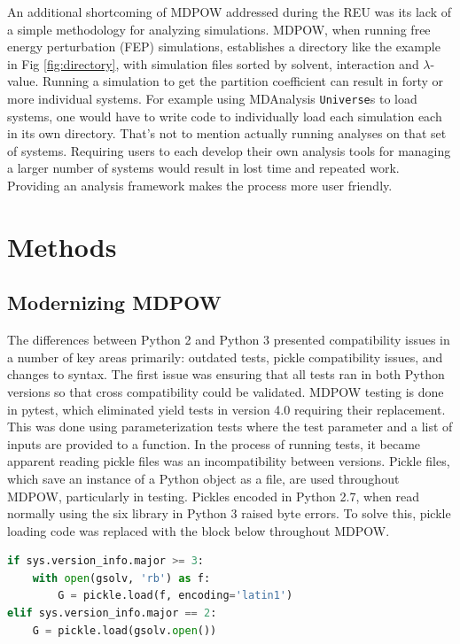 \documentclass{article}[letterpaper, margins=1in, 12pt]
\begin{document}
An additional shortcoming of MDPOW addressed during the REU was its lack of a simple methodology for analyzing simulations. MDPOW, when running free energy perturbation (FEP) simulations, establishes a directory like the example in Fig \ref{fig:directory}, with simulation files sorted by solvent, interaction and $\lambda$-value. Running a simulation to get the partition coefficient can result in forty or more individual systems. For example using MDAnalysis \texttt{Universe}s to load systems, one would have to write code to individually load each simulation each in its own directory. That's not to mention actually running analyses on that set of systems. Requiring users to each develop their own analysis tools for managing a larger number of systems would result in lost time and repeated work. Providing an analysis framework makes the process more user friendly.

\section{Methods}
\subsection{Modernizing MDPOW}

The differences between Python 2 and Python 3 presented compatibility issues in a number of key areas primarily: outdated tests, pickle compatibility issues, and changes to syntax. The first issue was ensuring that all tests ran in both Python versions so that cross compatibility could be validated. MDPOW testing is done in pytest, which eliminated yield tests in version 4.0 requiring their replacement. This was done using parameterization tests where the test parameter and a list of inputs are provided to a function. In the process of running tests, it became apparent reading pickle files was an incompatibility between versions. Pickle files, which save an instance of a Python object as a file, are used throughout MDPOW, particularly in testing. Pickles encoded in Python 2.7, when read normally using the six library in Python 3 raised byte errors. To solve this, pickle loading code was replaced with the block below throughout MDPOW. 

\begin{lstlisting}[language=Python]
if sys.version_info.major >= 3:
	with open(gsolv, 'rb') as f:
		G = pickle.load(f, encoding='latin1')
elif sys.version_info.major == 2:
	G = pickle.load(gsolv.open())
\end{lstlisting}
\end{document}
